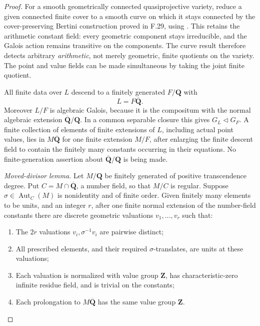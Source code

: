 \begin{proof}
For a smooth geometrically connected quasiprojective variety, reduce a
given connected finite cover to a smooth curve on which it stays connected
by the cover-preserving Bertini construction proved in F.29, using \citet[Theorem~1.5]{F_PoonenSlavov2020}. This
retains the arithmetic constant field: every geometric component stays
irreducible, and the Galois action remains transitive on the components.
The curve result therefore detects arbitrary \emph{arithmetic}, not merely
geometric, finite quotients on the variety. The point and value fields can
be made simultaneous by taking the joint finite quotient.

All finite data over \(L\) descend to a finitely generated
\(F/\mathbf Q\) with
\[
                    L=F\overline{\mathbf Q}.             \tag{F.45.2}
\]
Moreover \(L/F\) is algebraic Galois, because it is the compositum with
the normal algebraic extension \(\overline{\mathbf Q}/\mathbf Q\).
In a common separable closure this gives
\(G_L\triangleleft G_F\). A finite collection of elements of finite
extensions of \(L\), including actual point values, lies in
\(M\overline{\mathbf Q}\) for one finite extension \(M/F\), after
enlarging the finite descent field to contain the finitely many constants
occurring in their equations. No finite-generation assertion about
\(\overline{\mathbf Q}/\mathbf Q\) is being made.


\emph{Moved-divisor lemma.} Let \(M/\mathbf Q\) be finitely generated of positive
transcendence degree. Put \(C=M\cap\overline{\mathbf Q}\), a number
field, so that \(M/C\) is regular. Suppose
\(\sigma\in\operatorname{Aut}_C(M)\) is nonidentity and of finite order.
Given finitely many elements to be units, and an integer \(r\), after one
finite normal extension of the number-field constants there are discrete
geometric valuations \(v_1,\ldots,v_r\) such that:

\begin{enumerate}
\item The \(2r\) valuations \(v_i,\sigma^{-1}v_i\) are pairwise distinct;
\item All prescribed elements, and their required \(\sigma\)-translates,
   are units at these valuations;
\item Each valuation is normalized with value group \(\mathbf Z\), has
   characteristic-zero infinite residue field, and is trivial on the
   constants;
\item Each prolongation to \(M\overline{\mathbf Q}\) has the same value
   group \(\mathbf Z\).
\end{enumerate}


\end{proof}
